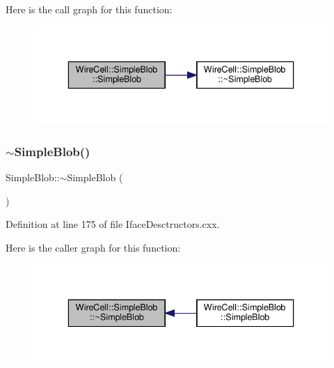 Here is the call graph for this function\+:
\nopagebreak
\begin{figure}[H]
\begin{center}
\leavevmode
\includegraphics[width=336pt]{class_wire_cell_1_1_simple_blob_a951bdf9fb09de509bd88a366fa657b69_cgraph}
\end{center}
\end{figure}
\mbox{\label{class_wire_cell_1_1_simple_blob_a81aaca8da596e55844a69db107e8596d}} 
\subsubsection{\texorpdfstring{$\sim$\+Simple\+Blob()}{~SimpleBlob()}}
{\footnotesize\ttfamily Simple\+Blob\+::$\sim$\+Simple\+Blob (\begin{DoxyParamCaption}{ }\end{DoxyParamCaption})\hspace{0.3cm}{\ttfamily [virtual]}}



Definition at line 175 of file Iface\+Desctructors.\+cxx.

Here is the caller graph for this function\+:
\nopagebreak
\begin{figure}[H]
\begin{center}
\leavevmode
\includegraphics[width=336pt]{class_wire_cell_1_1_simple_blob_a81aaca8da596e55844a69db107e8596d_icgraph}
\end{center}
\end{figure}



